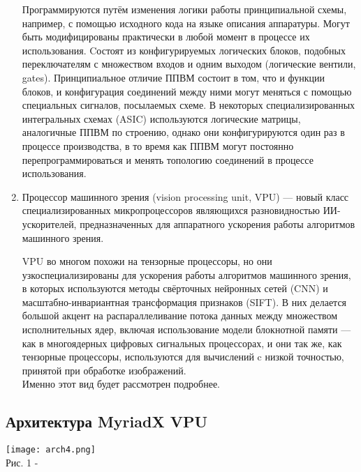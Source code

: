 \documentclass{article}
\begin{document}
\begin{enumerate}
    Программируются путём изменения логики работы принципиальной схемы, например, с помощью исходного кода на языке описания аппаратуры. Могут быть модифицированы практически в любой момент в процессе их использования. Cостоят из конфигурируемых логических блоков, подобных переключателям с множеством входов и одним выходом (логические вентили, gates). Принципиальное отличие ППВМ состоит в том, что и функции блоков, и конфигурация соединений между ними могут меняться с помощью специальных сигналов, посылаемых схеме. В некоторых специализированных интегральных схемах (ASIC) используются логические матрицы, аналогичные ППВМ по строению, однако они конфигурируются один раз в процессе производства, в то время как ППВМ могут постоянно перепрограммироваться и менять топологию соединений в процессе использования.
    \item
    Процессор машинного зрения (vision processing unit, VPU) — новый класс специализированных микропроцессоров являющихся разновидностью ИИ-ускорителей, предназначенных для аппаратного ускорения работы алгоритмов машинного зрения.
    
    VPU во многом похожи на тензорные процессоры, но они узкоспециализированы для ускорения работы алгоритмов машинного зрения, в которых используются методы свёрточных нейронных сетей (CNN) и масштабно-инвариантная трансформация признаков (SIFT). В них делается большой акцент на распараллеливание потока данных между множеством исполнительных ядер, включая использование модели блокнотной памяти — как в многоядерных цифровых сигнальных процессорах, и они так же, как тензорные процессоры, используются для вычислений c низкой точностью, принятой при обработке изображений.\\
    Именно этот вид будет рассмотрен подробнее.
    \end{enumerate} 
    
    \newpage
    \begin{center}
    \section{Архитектура MyriadX VPU}
    \end{center}
    
    \begin{center} 
    \texttt{[image: arch4.png]}
    \\
    \caption{Рис. 1 - }
    \\ \\
    \end{center} 
    \\
    
\end{document}
